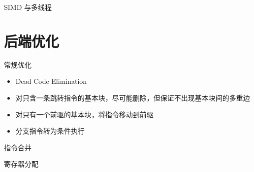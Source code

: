 \documentclass[aspectratio=169,UTF-8]{ctexbeamer}
\begin{document}
		\begin{frame}{SIMD 与多线程}
			
		\end{frame}
	
	\section{后端优化}
	
		\begin{frame}{常规优化}
			\begin{itemize}
				\item Dead Code Elimination
				\item 对只含一条跳转指令的基本块，尽可能删除，但保证不出现基本块间的多重边
				\item 对只有一个前驱的基本块，将指令移动到前驱
				\item 分支指令转为条件执行
			\end{itemize}
		\end{frame}
		
		\begin{frame}{指令合并}
			
		\end{frame}
		
		\begin{frame}{寄存器分配}
			
		\end{frame}
	
\end{document}
